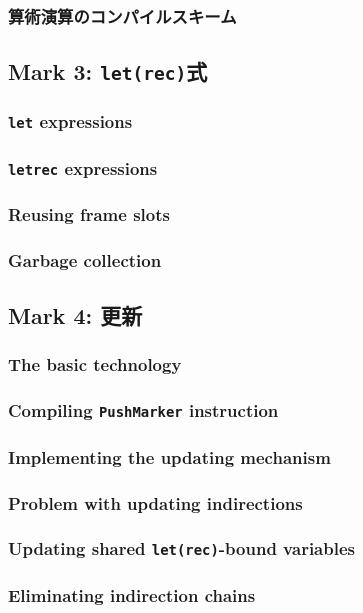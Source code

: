 \documentclass{jarticle}
\begin{document}
\subsubsection{算術演算のコンパイルスキーム}
\newpage

\subsection{Mark 3: \texttt{let(rec)}式}
\subsubsection{\texttt{let} expressions}
\subsubsection{\texttt{letrec} expressions}
\subsubsection{Reusing frame slots \dag}
\subsubsection{Garbage collection \dag}
\newpage

\subsection{Mark 4: 更新}
\subsubsection{The basic technology}
\subsubsection{Compiling \texttt{PushMarker} instruction}
\subsubsection{Implementing the updating mechanism}
\subsubsection{Problem with updating indirections}
\subsubsection{Updating shared \texttt{let(rec)}-bound variables}
\subsubsection{Eliminating indirection chains}
\end{document}
